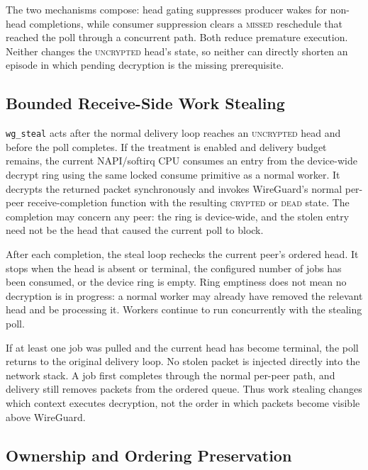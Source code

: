 

The two mechanisms compose: head gating suppresses producer wakes for
non-head completions, while consumer suppression clears a \textsc{missed}
reschedule that reached the poll through a concurrent path.  Both reduce
premature execution.  Neither changes the \textsc{uncrypted} head's state, so
neither can directly shorten an episode in which pending decryption is the
missing prerequisite.

\subsection{Bounded Receive-Side Work Stealing}
\label{sec:design-steal}

\texttt{wg\_steal} acts after the normal delivery loop reaches an
\textsc{uncrypted} head and before the poll completes.  If the treatment is
enabled and delivery budget remains, the current NAPI/softirq CPU consumes an
entry from the device-wide decrypt ring using the same locked consume primitive
as a normal worker.  It decrypts the returned packet synchronously and invokes
WireGuard's normal per-peer receive-completion function with the resulting
\textsc{crypted} or \textsc{dead} state.  The completion may concern any peer:
the ring is device-wide, and the stolen entry need not be the head that caused
the current poll to block.

After each completion, the steal loop rechecks the current peer's ordered
head.  It stops when the head is absent or terminal, the configured number of
jobs has been consumed, or the device ring is empty.  Ring emptiness does not
mean no decryption is in progress: a normal worker may already have removed
the relevant head and be processing it.  Workers continue to run concurrently
with the stealing poll.

If at least one job was pulled and the current head has become terminal, the
poll returns to the original delivery loop.  No stolen packet is injected
directly into the network stack.  A job first completes through the normal
per-peer path, and delivery still removes packets from the ordered queue.
Thus work stealing changes which context executes decryption, not the order in
which packets become visible above WireGuard.

\subsection{Ownership and Ordering Preservation}
\label{sec:design-safety}

